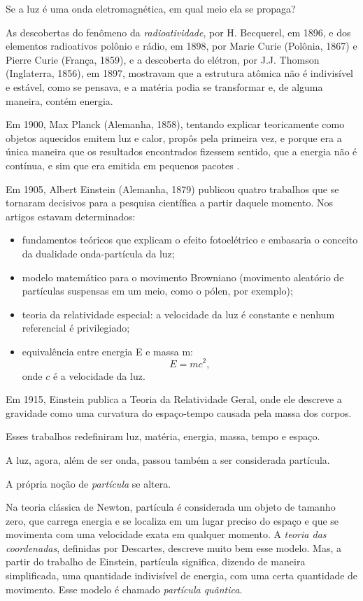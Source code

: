 \documentclass{hipatia}
\begin{document}
Se a luz é uma onda eletromagnética, em qual meio ela se propaga?

As descobertas do fenômeno da \textit{radioatividade}, por H. Becquerel, em 1896, e dos elementos radioativos polônio e rádio, em 1898, por Marie Curie (Polônia, 1867) e Pierre Curie (França, 1859), e a descoberta do elétron, por J.J. Thomson (Inglaterra, 1856), em 1897, mostravam que a estrutura atômica não é indivisível e estável, como se pensava, e a matéria podia se transformar e, de alguma maneira, contém energia.

Em 1900, Max Planck (Alemanha, 1858), tentando explicar teoricamente como objetos aquecidos emitem luz e calor, propôs pela primeira vez, e porque era a única maneira que os resultados encontrados fizessem sentido, que a energia não é contínua, e sim que era emitida em pequenos pacotes \cite{Planck1900}.

Em 1905, Albert Einstein (Alemanha, 1879) \cite{EinsteinCollected} publicou quatro trabalhos que se  tornaram decisivos para a pesquisa científica a partir daquele momento. Nos artigos estavam determinados:

\begin{itemize}
    \item fundamentos teóricos que explicam o efeito fotoelétrico e embasaria o conceito da dualidade onda-partícula da luz;
\item  modelo matemático para o movimento Browniano (movimento aleatório de partículas suspensas em um meio, como o pólen, por exemplo);
\item teoria da relatividade especial: a velocidade da luz é constante e nenhum referencial é privilegiado;
\item equivalência entre energia E e massa m: $$E = m c^2,$$ onde $c$ é a velocidade da luz.
\end{itemize}


Em 1915, Einstein publica a Teoria da Relatividade Geral, onde ele descreve a gravidade como uma curvatura do espaço-tempo causada pela massa dos corpos.

Esses trabalhos redefiniram luz, matéria, energia, massa, tempo e espaço.

A luz, agora, além de ser onda, passou também a ser considerada partícula.

A própria noção de \textit{partícula} se altera.

Na teoria clássica de Newton, partícula é considerada um objeto de tamanho zero, que carrega energia e se localiza em um lugar preciso do espaço e que se movimenta com uma velocidade exata em qualquer momento. A \textit{teoria das coordenadas}, definidas por Descartes, descreve muito bem esse modelo. Mas, a partir do trabalho de Einstein, partícula significa, dizendo de maneira simplificada, uma quantidade indivisível de energia, com uma certa quantidade de movimento. Esse modelo é chamado \textit{partícula quântica}.
\end{document}
